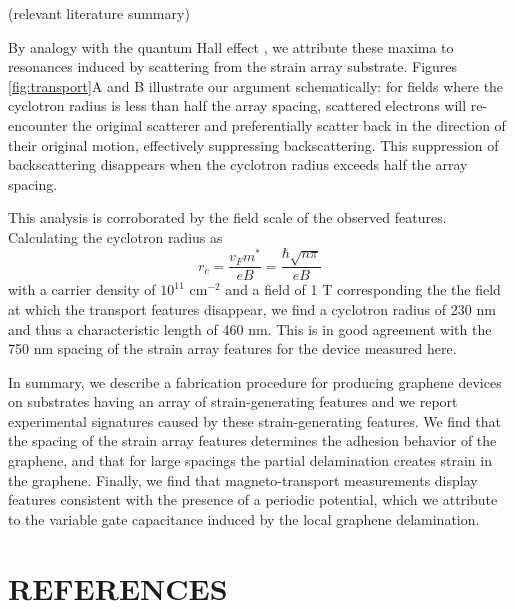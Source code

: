 \documentclass[%
 aip,
 apl,%
 amsmath,amssymb,
 reprint,%
]{revtex4-1}
\begin{document}
(relevant literature summary)



By analogy with the quantum Hall effect \cite{buttiker1988absence}, 
we attribute these maxima to resonances induced by scattering from the strain array substrate.
Figures \ref{fig:transport}A and B illustrate our argument schematically:
for fields where the cyclotron radius is less than half the array spacing, scattered electrons   
will re-encounter the original scatterer and preferentially scatter back in the direction of
their original motion, effectively suppressing backscattering. This suppression of backscattering
disappears when the cyclotron radius exceeds half the array spacing.

This analysis is corroborated by the field scale of the observed features. 
Calculating the cyclotron radius as 
\begin{equation}
    r_c = \frac{v_F m^*}{e B} = \frac{\hbar \sqrt{n \pi}}{e B}
\end{equation}
with a carrier density of $10^{11}$ cm$^{-2}$ and a field of 1 T corresponding the the field 
at which the transport features disappear, 
we find a cyclotron radius of 230 nm and thus a characteristic length of 460 nm.
This is in good agreement with the 750 nm spacing of the strain array features for the device measured here.

In summary, we describe a fabrication procedure for producing graphene devices on
substrates having an array of strain-generating features and we report experimental signatures
caused by these strain-generating features. We find that the spacing of the strain array features
determines the adhesion behavior of the graphene, and that for large spacings the partial
delamination creates strain in the graphene. Finally, we find that magneto-transport measurements
display features consistent with the presence of a periodic potential, which we attribute to the 
variable gate capacitance induced by the local graphene delamination.



\section*{REFERENCES}


\end{document}
